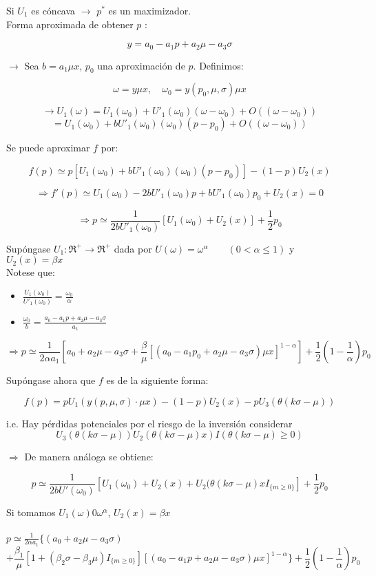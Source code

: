  Si $U_1$ es cóncava $\rightarrow$ $p^*$ es un maximizador.\\

  Forma aproximada de obtener $p$ :

  \[y=a_0-a_1p+a_2\mu-a_3\sigma\]

  $\rightarrow$ Sea $b=a_1\mu x$, $p_0$ una aproximación de $p$. Definimos:

  \[\omega=y\mu x,\quad \omega_0=y(p_0,\mu,\sigma)\mu x\]

  \[\rightarrow U_1(\omega)=U_1(\omega_0)+U'_1(\omega_0)(\omega-\omega_0)+O((\omega-\omega_0))\]
  \[=U_1(\omega_0)+bU'_1(\omega_0)(\omega_0)(p-p_0)+O((\omega-\omega_0))\]

  Se puede aproximar $f$ por:

  \[f(p)\simeq p[U_1(\omega_0)+bU'_1(\omega_0)(\omega_0)(p-p_0)]-(1-p)U_2(x)\]

  \[\Rightarrow f'(p)\simeq U_1(\omega_0)-2bU'_1(\omega_0)p+bU'_1(\omega_0)p_0+U_2(x)=0\]

  \[\Rightarrow p\simeq \frac{1}{2bU'_1(\omega_0)}[U_1(\omega_0)+U_2(x)]+\frac{1}{2}p_0\]

 Supóngase $U_1:\Re^+ \rightarrow \Re^+$ dada por $U(\omega)=\omega^\alpha\qquad(0<\alpha\le1)$ y $U_2(x)=\beta x$\\

 Notese que:
 \begin{itemize}
  \item ${\displaystyle\frac{U_1(\omega_0)}{U'_1(\omega_0)}=\frac{\omega_0}{\alpha}}$
  \item ${\displaystyle\frac{\omega_0}{b}=\frac{a_0-a_1p+a_2\mu-a_3\sigma}{a_1}}$
 \end{itemize}

 \[\Rightarrow p\simeq \frac{1}{2\alpha a_1}[a_0+a_2\mu-a_3\sigma+\frac{\beta}{\mu}[(a_0-a_1p_0+a_2\mu-a_3\sigma)\mu x]^{1-\alpha}]+\frac{1}{2}(1-\frac{1}{\alpha})p_0\]

 Supóngase ahora que $f$ es de la siguiente forma:

 \[f(p)=pU_1(y(p,\mu,\sigma)\cdot \mu x)-(1-p)U_2(x)-pU_3(\theta(k\sigma-\mu))\]

 i.e. Hay pérdidas potenciales por el riesgo de la inversión considerar
 \[U_3(\theta(k\sigma-\mu))U_2(\theta(k\sigma-\mu)x)I(\theta(k\sigma-\mu)\ge 0)\]

 $\Rightarrow$ De manera análoga se obtiene:

 \[p\simeq\frac{1}{2bU'(\omega_0)}[U_1(\omega_0)+U_2(x)+U_2(\theta(k\sigma-\mu)xI_{\{m\ge0\}}]+\frac{1}{2}p_0\]

 \newpage
 Si tomamos $U_1(\omega)0\omega^\alpha$, $U_2(x)=\beta x$ \\\\

 $p\simeq \frac{1}{2\alpha a_1}\{(a_0+a_2\mu-a_3\sigma)$
 \[+\frac{\beta_1}{\mu}[1+(\beta_2\sigma-\beta_3 \mu)I_{\{m\ge0\}}][(a_0-a_1p+a_2\mu-a_3\sigma)\mu x]^{1-\alpha}\}+\frac{1}{2}(1-\frac{1}{\alpha})p_0\]

 